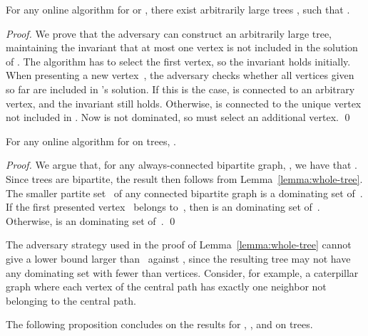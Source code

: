 \begin{lemma}
\label{lemma:whole-tree}
For any online algorithm \A for \ds or \cds, there exist arbitrarily
large trees , such that .
\end{lemma}
\begin{proof}
We prove that the adversary can construct an arbitrarily large tree,
maintaining the invariant that at most 
one vertex is not included in the solution of \A.  The algorithm has
to select the first vertex, so the invariant holds initially.
When presenting a new vertex~, the adversary
checks whether all vertices given so far are included in \A's
solution.  If this is the case,  is connected to an arbitrary
vertex, and the invariant still holds.  Otherwise,  is
connected to the unique vertex not included in .
Now  is not dominated, so \A must select an additional vertex.
\qed\end{proof}

\begin{proposition}
\label{prop:dsonlower}
For any online algorithm \A for \ds on trees, .
\end{proposition}
\begin{proof}
We argue that, for any always-connected bipartite graph, ,
we have that .
Since trees are bipartite, the result then follows from Lemma~\ref{lemma:whole-tree}.
The smaller partite set~ of any connected bipartite
graph  is a dominating set of~.
If the first presented vertex~ belongs to~, then  is
an \incr dominating set of~. Otherwise,  is an
\incr dominating set of~.
\qed\end{proof}

The adversary strategy used in the proof of
Lemma~\ref{lemma:whole-tree} cannot give a
lower bound larger than~ against \offopt, since the resulting tree
may not have any dominating set with fewer than  vertices. 
Consider, for example, a caterpillar graph where each vertex of the
central path has exactly one neighbor not belonging to the central
path.

The following proposition concludes on the results for \ds, \cds, and
\tds on trees.

